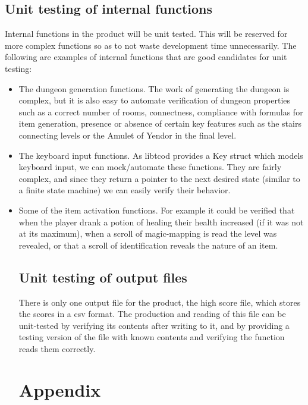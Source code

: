 \documentclass[12pt, titlepage]{article}
\begin{document}
	\subsection{Unit testing of internal functions}
		Internal functions in the product will be unit tested. This will be reserved for more complex functions so as to not waste development time unnecessarily. The following are examples of internal functions that are good candidates for unit testing:
		\begin{itemize}
			\item The dungeon generation functions. The work of generating the dungeon is complex, but it is also easy to automate verification of dungeon properties such as a correct number of rooms, connectness, compliance with formulas for item generation, presence or absence of certain key features such as the stairs connecting levels or the Amulet of Yendor in the final level.
			\item The keyboard input functions. As libtcod provides a Key struct which models keyboard input, we can mock/automate these functions. They are fairly complex, and since they return a pointer to the next desired state (similar to a finite state machine) we can easily verify their behavior.
			\item Some of the item activation functions. For example it could be verified that when the player drank a potion of healing their health increased (if it was not at its maximum), when a scroll of magic-mapping is read the level was revealed, or that a scroll of identification reveals the nature of an item.

	\subsection{Unit testing of output files}
		There is only one output file for the product, the high score file, which stores the scores in a csv format. The production and reading of this file can be unit-tested by verifying its contents after writing to it, and by providing a testing version of the file with known contents and verifying the function reads them correctly.

% 

% 

\newpage

\section{Appendix}


\end{itemize}
\end{document}
